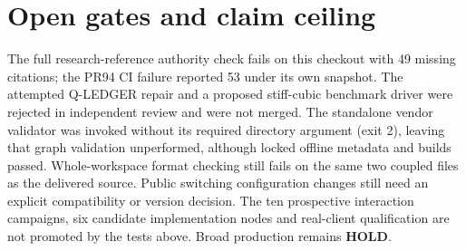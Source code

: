 \documentclass[aps,pra,reprint,onecolumn,10pt,notitlepage,nofootinbib]{revtex4-2}
\begin{document}
\section{Open gates and claim ceiling}
The full research-reference authority check fails on this checkout with 49
missing citations; the PR94 CI failure reported 53 under its own snapshot.
The attempted Q-LEDGER repair and a proposed stiff-cubic benchmark driver
were rejected in independent review and were not merged. The standalone vendor validator was invoked without its required directory
argument (exit 2), leaving that graph validation unperformed, although locked
offline metadata and builds passed. Whole-workspace
format checking still fails on the same two coupled files as the delivered
source. Public switching configuration changes still need an explicit
compatibility or version decision. The ten prospective interaction campaigns,
six candidate implementation nodes and real-client qualification are not
promoted by the tests above. Broad production remains \textbf{HOLD}.
\end{document}
